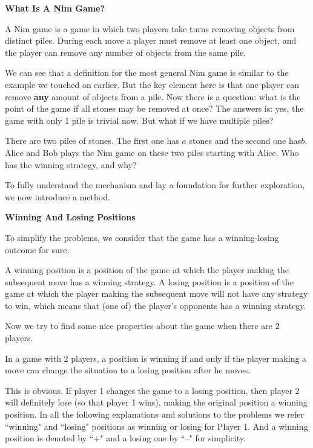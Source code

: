 	\noindent
	\textbf{What Is A Nim Game?}
	
		\begin{definition}
		A Nim game is a game in which two players take turns removing objects from distinct piles. During each move a player must remove at least one object, and the player can remove any number of objects from the same pile. 
		\end{definition}
		
		We can see that a definition for the most general Nim game is similar to the example we touched on earlier. But the key element here is that one player can remove \textbf{any} amount of objects from a pile. Now there is a question: what is the point of the game if all stones may be removed at once? The answers is: yes, the game with only 1 pile is trivial now. But what if we have multiple piles?
		\begin{problem}
			There are two piles of stones. The first one has $a$ stones and the second one has$b$. Alice and Bob plays the Nim game on these two piles starting with Alice. Who has the winning strategy, and why?
		\end{problem}
		To fully understand the mechanism and lay a foundation for further exploration, we now introduce a method.
	
\noindent	
	\textbf{Winning And Losing Positions}
	
		To simplify the problems, we consider that the game has a winning-losing outcome for sure.
		\begin{definition}
			A winning position is a position of the game at which the player making the subsequent move has a winning strategy. A losing position is a position of the game at which the player making the subsequent move will not have any strategy to win, which means that (one of) the player's opponents has a winning strategy.
		\end{definition}
		Now we try to find some nice properties about the game when there are 2 players.
		\begin{theorem}
			In a game with 2 players, a position is winning if and only if the player making a move can change the situation to a losing position after he moves.
		\end{theorem}
		This is obvious. If player 1 changes the game to a losing position, then player 2 will definitely lose (so that player 1 wins), making the original position a winning position. In all the following explanations and solutions to the problems we refer ``winning" and ``losing" positions as winning or losing for Player 1. And a winning position is denoted by ``$+$" and a losing one by ``$–$" for simplicity.
		
